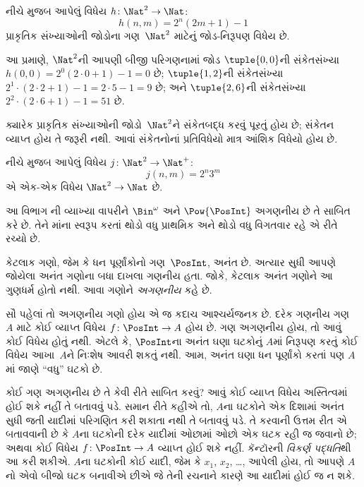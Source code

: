 \begin{ex}
નીચે મુજબ આપેલું વિધેય $h\colon \Nat^2 \to \Nat$:
\[
h(n,m) = 2^n (2m+1) - 1
\]
પ્રાકૃતિક સંખ્યાઓની જોડોના ગણ~$\Nat^2$ માટેનું
જોડ-નિરૂપણ વિધેય છે.
\end{ex}

\begin{explain}
આ પ્રમાણે, $\Nat^2$ની આપણી બીજી પરિગણનામાં
જોડ $\tuple{0,0}$ની સંકેતસંખ્યા
$h(0,0) = 2^0(2\cdot 0+1) - 1 = 0$ છે;
$\tuple{1,2}$ની સંકેતસંખ્યા
$2^{1} \cdot (2 \cdot 2 + 1) - 1 = 2
\cdot 5 - 1 = 9$ છે; અને $\tuple{2,6}$ની
સંકેતસંખ્યા $2^{2} \cdot (2
\cdot 6 + 1) - 1 = 51$ છે.
\end{explain}

ક્યારેક પ્રાકૃતિક સંખ્યાઓની જોડો~$\Nat^2$ને
સંકેતબદ્ધ કરવું પૂરતું હોય છે; સંકેતન વ્યાપ્ત હોય
તે જરૂરી નથી. આવાં સંકેતનોનાં પ્રતિવિધેયો
માત્ર આંશિક વિધેયો હોય છે.

\begin{ex}
નીચે મુજબ આપેલું વિધેય $j\colon \Nat^2 \to \Nat^+$:
\[
j(n,m) = 2^n3^m
\]
એ એક-એક વિધેય $\Nat^2 \to \Nat$ છે.
\end{ex}
\endgroup


\begingroup
\makeatletter{}\makeatother


\label{guunit:OLP-0033}


\begin{editorial}
  આ વિભાગ ની વ્યાખ્યા વાપરીને
  $\Bin^\omega$ અને $\Pow{\PosInt}$ અગણનીય છે તે સાબિત કરે છે.
  તેને માંના સ્વરૂપ કરતાં થોડો વધુ
  પ્રાથમિક અને થોડો વધુ વિગતવાર રહે એ રીતે રચ્યો છે.
\end{editorial}

કેટલાક ગણો, જેમ કે ધન પૂર્ણાંકોનો ગણ~$\PosInt$, અનંત છે.
અત્યાર સુધી આપણે જોયેલા અનંત ગણોના બધા દાખલા
ગણનીય હતા. જોકે, કેટલાક અનંત ગણોને આ ગુણધર્મ
હોતો નથી. આવા ગણોને \emph{અગણનીય} કહે છે.

સૌ પહેલાં તો અગણનીય ગણો હોય એ જ કદાચ આશ્ચર્યજનક છે.
દરેક ગણનીય ગણ~$A$ માટે કોઈ વ્યાપ્ત વિધેય
$f \colon \PosInt \to A$ હોય છે. ગણ અગણનીય હોય,
તો આવું કોઈ વિધેય હોતું નથી. એટલે કે, $\PosInt$ના અનંત ઘણા
ઘટકોનું $A$માં નિરૂપણ કરતું કોઈ વિધેય આખા~$A$ને
નિઃશેષ આવરી શકતું નથી. આમ, અનંત ઘણા ધન પૂર્ણાંકો કરતાં પણ
$A$માં જાણે ``વધુ'' ઘટકો છે.

કોઈ ગણ અગણનીય છે તે કેવી રીતે સાબિત કરવું?
આવું કોઈ વ્યાપ્ત વિધેય અસ્તિત્વમાં હોઈ શકે નહીં તે બતાવવું પડે.
સમાન રીતે કહીએ તો, $A$ના ઘટકોને એક દિશામાં અનંત સુધી જતી
યાદીમાં પરિગણિત કરી શકાતા નથી તે બતાવવું પડે. તે કરવાની ઉત્તમ
રીત એ બતાવવાની છે કે $A$ના ઘટકોની દરેક યાદીમાં ઓછામાં
ઓછો એક ઘટક રહી જ જવાનો છે; અથવા કોઈ વિધેય
$f\colon \PosInt \to A$ વ્યાપ્ત હોઈ શકે નહીં. કૅન્ટૉરની
\emph{વિકર્ણ પદ્ધતિ}થી આ કરી શકીએ. $A$ના ઘટકોની કોઈ
યાદી, જેમ કે $x_1$, $x_2$, \dots, આપેલી હોય, તો આપણે $A$નો
એવો બીજો ઘટક બનાવીએ છીએ જે તેની રચનાને કારણે આ યાદીમાં હોઈ જ ન શકે.

